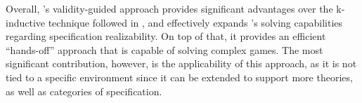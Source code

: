 Overall, \jsynvg's validity-guided approach provides significant advantages
over the k-inductive technique followed in \jsyn, and effectively expands
\jkind's solving capabilities regarding specification realizability. On top of that, it provides an efficient ``hands-off'' approach that is capable of solving complex games.
The most significant contribution, however, is the applicability of this approach, as it is not tied to a specific environment since it can be extended to support more
theories, as well as categories of specification.
